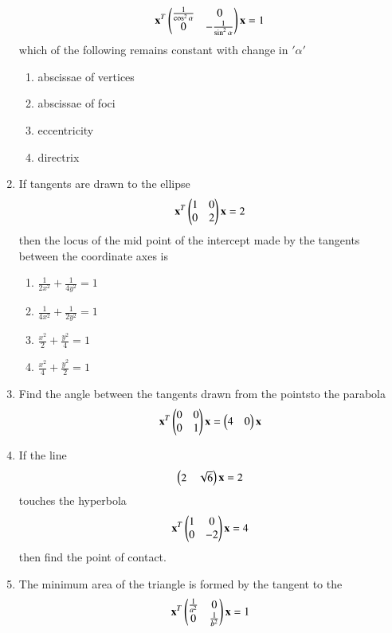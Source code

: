 \begin{enumerate}[label=\arabic*.,ref=\thesubsection.\theenumi]
    \begin{align} 
    \mathbf {x}^T\begin{pmatrix}\frac{1}{\cos^2\alpha} & 0 \\0 & -\frac{1}{\sin^2\alpha}\end{pmatrix} \mathbf{x}=1
    \end{align} which of the following remains constant with change in $'\alpha'$
    \begin{enumerate}
    \item abscissae of vertices
    \item abscissae of foci
    \item eccentricity
    \item directrix
    \end{enumerate}
\item If tangents are drawn to the ellipse 
    \begin{align}
    \mathbf{x}^T\begin{pmatrix}1&0\\0&2\end{pmatrix}\mathbf{x}=2
    \end{align}
    then the locus of the mid point of the intercept made by the tangents between the coordinate axes 	is
    \begin{enumerate}
    \item$\frac{1}{2x^2}+\frac{1}{4y^2}=1$
    \item $\frac{1}{4x^2}+\frac{1}{2y^2}=1$
    \item $\frac{x^2}{2}+\frac{y^2}{4}=1$
    \item $\frac{x^2}{4}+\frac{y^2}{2}=1$
    \end{enumerate}
\item Find the angle between the tangents drawn from the pointsto the parabola 
    \begin{align}
    \mathbf{x}^T\begin{pmatrix}0 & 0 \\0 & 1\end{pmatrix}\mathbf{x}=\begin{pmatrix}4&0\end{pmatrix}\mathbf{x} 
    \end{align}
\item If the line 
    \begin{align}
    \begin{pmatrix}2&\sqrt{6}\end{pmatrix}\mathbf{x}=2
    \end{align} touches the hyperbola
    \begin{align}
    \mathbf{x}^T\begin{pmatrix}1 & 0 \\0 & -2\end{pmatrix} \mathbf{x}=4
    \end{align}then find the point of contact.
\item The minimum area of the triangle is formed by the tangent to the 
    \begin{align}
    \vec {x}^T \myvec{\frac{1}{a^2}& 0 \\0 & \frac{1}{b^2}} \vec{x}=1

\end{align}
\end{enumerate}
